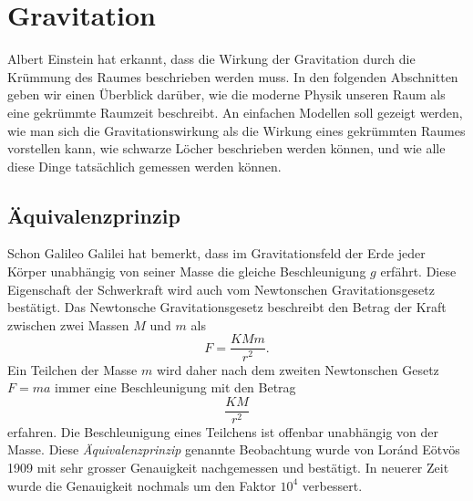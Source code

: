 %
%
%
\chapter{Gravitation%
\label{skript:chapter:gravitation}}
\rhead{}
Albert Einstein hat erkannt, dass die Wirkung der Gravitation 
durch die Krümmung des Raumes beschrieben werden muss.
%
In den folgenden Abschnitten geben wir einen Überblick darüber, wie
die moderne Physik unseren Raum als eine gekrümmte Raumzeit beschreibt.
An einfachen Modellen soll gezeigt werden, wie man sich die Gravitationswirkung
als die Wirkung eines gekrümmten Raumes vorstellen kann, wie schwarze Löcher
%
%
beschrieben werden können, und wie alle diese Dinge tatsächlich gemessen
werden können.

\section{Äquivalenzprinzip}
Schon Galileo Galilei hat bemerkt, dass im Gravitationsfeld der Erde
%
%
jeder Körper unabhängig von seiner Masse die gleiche Beschleunigung $g$
erfährt.
Diese Eigenschaft der Schwerkraft wird auch vom Newtonschen Gravitationsgesetz
bestätigt.
%
Das Newtonsche Gravitationsgesetz beschreibt den Betrag der Kraft
zwischen zwei Massen $M$ und $m$ als
\[
F=\frac{KMm}{r^2}.
\]
Ein Teilchen der Masse $m$ wird daher nach dem zweiten Newtonschen Gesetz
$F=ma$ immer eine Beschleunigung mit den Betrag
\[
\frac{KM}{r^2}
\]
erfahren.
Die Beschleunigung eines Teilchens ist offenbar unabhängig von der Masse.
Diese {\em Äqui\-va\-lenz\-prinzip} genannte Beobachtung wurde von
Lor\'and Eötvös 1909 mit sehr grosser Genauigkeit nachgemessen und bestätigt.
In neuerer Zeit wurde die Genauigkeit nochmals um den Faktor $10^4$
verbessert.
%
%

